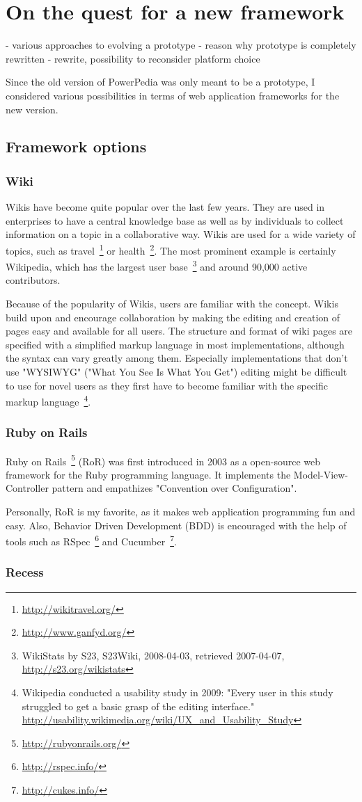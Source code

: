 \section{On the quest for a new framework}
- various approaches to evolving a prototype
- reason why prototype is completely rewritten
- rewrite, possibility to reconsider platform choice

Since the old version of PowerPedia was only meant to be a prototype, I considered various possibilities in terms of web application frameworks for the new version. 

\subsection{Framework options}
\subsubsection{Wiki}
Wikis have become quite popular over the last few years. They are used in enterprises to have a central knowledge base as well as by individuals to collect information on a topic in a collaborative way. Wikis are used for a wide variety of topics, such as travel~\footnote{\url{http://wikitravel.org/}} or health~\footnote{\url{http://www.ganfyd.org/}}. The most prominent example is certainly Wikipedia, which has the largest user base~\footnote{WikiStats by S23, S23Wiki, 2008-04-03, retrieved 2007-04-07, \url{http://s23.org/wikistats}} and around 90,000 active contributors.

Because of the popularity of Wikis, users are familiar with the concept. Wikis build upon and encourage collaboration by making the editing and creation of pages easy and available for all users. The structure and format of wiki pages are specified with a simplified markup language in most implementations, although the syntax can vary greatly among them. Especially implementations that don't use "WYSIWYG" ("What You See Is What You Get") editing might be difficult to use for novel users as they first have to become familiar with the specific markup language~\footnote{Wikipedia conducted a usability study in 2009: "Every user in this study struggled to get a basic grasp of the editing interface." \url{http://usability.wikimedia.org/wiki/UX_and_Usability_Study}}. 

\subsubsection{Ruby on Rails}
Ruby on Rails~\footnote{\url{http://rubyonrails.org/}} (RoR) was first introduced in 2003 as a open-source web framework for the Ruby programming language. It implements the Model-View-Controller pattern and empathizes "Convention over Configuration". 

Personally, RoR is my favorite, as it makes web application programming fun and easy. Also, Behavior Driven Development (BDD) is encouraged  with the help of tools such as RSpec~\footnote{\url{http://rspec.info/}} and Cucumber~\footnote{\url{http://cukes.info/}}.
\subsubsection{Recess}